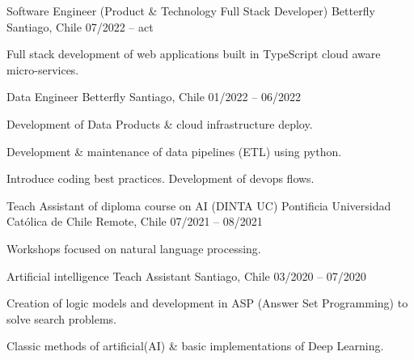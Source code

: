 \begin{cventries}
\cventry
{Software Engineer (Product \& Technology Full Stack Developer)} %
{Betterfly} %
{Santiago, Chile} %
{07/2022 – act} %
{
  \begin{cvitems} %
    \item {Full stack development of web applications built in TypeScript cloud aware micro-services.}
  \end{cvitems}
}
\newline
\cventry
  {Data Engineer} %
  {Betterfly} %
  {Santiago, Chile} %
  {01/2022 – 06/2022} %
  {
    \begin{cvitems} %
      \item {Development of Data Products \& cloud infrastructure deploy.}
      \item {Development \& maintenance of data pipelines (ETL) using python.}
      \item {Introduce coding best practices. Development of devops flows.}
    \end{cvitems}
  }
  \newline
\cventry
  {Teach Assistant of diploma course on AI (DINTA UC)} %
  {Pontificia Universidad Católica de Chile} %
  {Remote, Chile} %
  {07/2021 – 08/2021} %
  {
    \begin{cvitems} %
      \item {Workshops focused on natural language processing.}
    \end{cvitems}
  }
  \newline
  \cventry
    {Artificial intelligence Teach Assistant} %
    {} %
    {Santiago, Chile} %
    {03/2020 – 07/2020} %
    {
      \begin{cvitems} %
        \item {Creation of logic models and development in ASP (Answer Set Programming) to solve search problems.}
        \item {Classic methods of artificial(AI) \& basic implementations of Deep Learning.}
      \end{cvitems}
    }
    \newline


\end{cventries}
